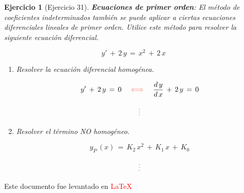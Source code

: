 \documentclass[a4paper,11pt, openany]{book}
\newtheorem{ejer}{Ejercicio}[section]
\newcommand*{\itembolasazules}[1]{%
\footnotesize\protect\tikz[baseline=-3pt]%
\protect\node[scale=.7, circle, shade, ball
color=green]{\color{white}\Large\bf#1};}
\begin{document}
\begin{ejer}[Ejercicio 31]
 
{\bf Ecuaciones de primer orden}: El método de coeficientes indeterminados también se puede aplicar a ciertas ecuaciones diferenciales lineales de primer orden. Utilice este método para resolver la siguiente ecuación diferencial.
 
$$\boxed{y'\,+\,2\,y\,=\,x^{2}\,+\,2\,x }$$
 
\begin{enumerate}[label=\itembolasazules{\arabic*}]
 
 
\item Resolver la ecuación diferencial homogénea.
 
$$y'\,+\,2\,y\,=\,0 \quad \textcolor{tomato}{\iff} \quad \dfrac{d\,y}{d\,x}\,+\,2\,y\,=\,0$$
 
$$\textcolor{tomato}{\vdots}$$
 
\item Resolver el término NO homogéneo.
 
$$\boxed{y_{P}\,(x)\,=\,K_{2}\,x^{2}\,+\,K_{1}\,x\,+\,K_{0}}$$
 
$$\textcolor{tomato}{\vdots}$$ 
 
 
 
\end{enumerate}

\end{ejer}
 
Este documento fue levantado en \textcolor{red}{\LaTeX}
 
\end{document}
